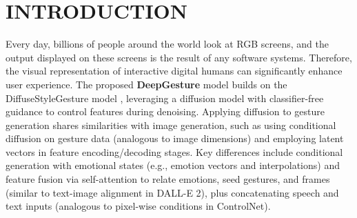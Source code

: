 \section{INTRODUCTION}
\label{sec:introduction}

Every day, billions of people around the world look at RGB screens, and the output displayed on these screens is the result of any software systems. Therefore, the visual representation of interactive digital humans can significantly enhance user experience. The proposed \textbf{DeepGesture} model builds on the DiffuseStyleGesture model \cite{yang2023diffusestylegesture}, leveraging a diffusion model \cite{ho2020denoising} with classifier-free guidance \cite{ho2022classifier} to control features during denoising. Applying diffusion to gesture generation shares similarities with image generation, such as using conditional diffusion on gesture data (analogous to image dimensions) and employing latent vectors in feature encoding/decoding stages. Key differences include conditional generation with emotional states (e.g., emotion vectors and interpolations) and feature fusion via self-attention to relate emotions, seed gestures, and frames (similar to text-image alignment in DALL-E 2), plus concatenating speech and text inputs (analogous to pixel-wise conditions in ControlNet).






